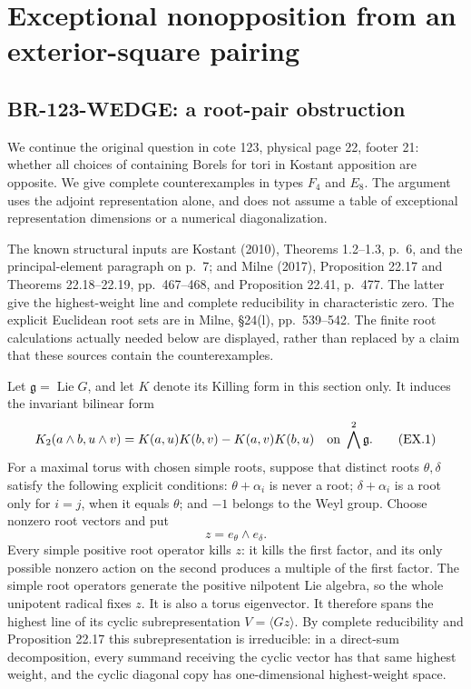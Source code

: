 \section{Exceptional nonopposition from an exterior-square pairing}

\subsection{BR-123-WEDGE: a root-pair obstruction}
We continue the original question in cote 123, physical page 22,
footer 21: whether all choices of containing Borels for tori in
Kostant apposition are opposite.  We give complete counterexamples
in types $F_4$ and $E_8$.  The argument uses the adjoint representation
alone, and does not assume a table of exceptional representation
dimensions or a numerical diagonalization.

The known structural inputs are Kostant (2010), Theorems 1.2--1.3,
p.~6, and the principal-element paragraph on p.~7; and Milne (2017),
Proposition 22.17 and Theorems 22.18--22.19, pp.~467--468,
and Proposition 22.41, p.~477.  The latter give the highest-weight
line and complete reducibility in characteristic zero.  The explicit
Euclidean root sets are in Milne, \S24(l), pp.~539--542.  The finite
root calculations actually needed below are displayed, rather than
replaced by a claim that these sources contain the counterexamples.

Let $\mathfrak g=\operatorname{Lie}G$, and let $K$ denote its Killing
form in this section only.  It induces the invariant bilinear form
\[
 K_2(a\wedge b,u\wedge v)
       =K(a,u)K(b,v)-K(a,v)K(b,u)
       \quad\hbox{on }\bigwedge^2\mathfrak g.
 \tag{EX.1}
\]
For a maximal torus with chosen simple roots, suppose that distinct
roots $\theta,\delta$ satisfy the following explicit conditions:
$\theta+\alpha_i$ is never a root; $\delta+\alpha_i$ is a root
only for $i=j$, when it equals $\theta$; and $-1$ belongs to the
Weyl group.  Choose nonzero root vectors and put
\[
                         z=e_\theta\wedge e_\delta.
\]
Every simple positive root operator kills $z$: it kills the first
factor, and its only possible nonzero action on the second produces
a multiple of the first factor.  The simple root operators generate
the positive nilpotent Lie algebra, so the whole unipotent radical
fixes $z$.  It is also a torus eigenvector.  It therefore spans the
highest line of its cyclic subrepresentation $V=\langle Gz\rangle$.
By complete reducibility and Proposition 22.17 this subrepresentation
is irreducible: in a direct-sum decomposition, every summand receiving
the cyclic vector has that same highest weight, and the cyclic
diagonal copy has one-dimensional highest-weight space.

